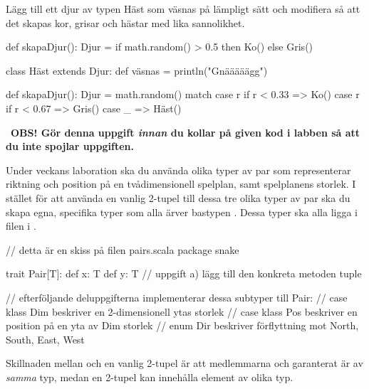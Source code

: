 \Subtask Lägg till ett djur av typen Häst som väsnas på lämpligt sätt och modifiera  så att det skapas kor, grisar och hästar med lika sannolikhet.


\SOLUTION


\TaskSolved \what


\SubtaskSolved
\begin{Code}
def skapaDjur(): Djur = 
  if math.random() > 0.5 then Ko() else Gris()
\end{Code}

\SubtaskSolved
\begin{Code}
class Häst extends Djur: 
  def väsnas = println("Gnääääägg") 

def skapaDjur(): Djur = 
   math.random() match
    case r if r < 0.33 => Ko() 
    case r if r < 0.67 => Gris() 
    case _             => Häst()
\end{Code}


\QUESTEND







\QUESTBEGIN


\Task\label{exe:inheritance:labprep-pair}  \what~\textbf{OBS! Gör denna uppgift \textit{innan} du kollar på given kod i labben så att du inte spojlar uppgiften.}

Under veckans laboration ska du använda olika typer av par som representerar riktning och position på en tvådimensionell spelplan, samt spelplanens storlek. I stället för att använda en vanlig 2-tupel till dessa tre olika typer av par ska du skapa egna, specifika  typer som alla ärver bastypen . Dessa typer ska alla ligga i filen  i .
\begin{Code}
// detta är en skiss på filen pairs.scala
package snake

trait Pair[T]:
  def x: T
  def y: T
  // uppgift a) lägg till den konkreta metoden tuple

// efterföljande deluppgifterna implementerar dessa subtyper till Pair:
//   case klass Dim beskriver en 2-dimensionell ytas storlek
//   case klass Pos beskriver en position på en yta av Dim storlek
//   enum Dir beskriver förflyttning mot North, South, East, West
\end{Code}
Skillnaden mellan  och en vanlig 2-tupel är att medlemmarna  och  garanterat är av \emph{samma} typ, medan en 2-tupel kan innehålla element av olika typ.

